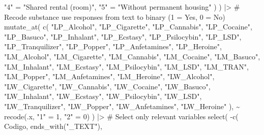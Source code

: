\documentclass[
  bookmarksnumbered]{article}
\newenvironment{Shaded}{\begin{snugshade}}{\end{snugshade}}
\newcommand{\CommentTok}[1]{\textcolor[rgb]{0.50,0.62,0.50}{#1}}
\newcommand{\DecValTok}[1]{\textcolor[rgb]{0.86,0.86,0.80}{#1}}
\newcommand{\FunctionTok}[1]{\textcolor[rgb]{0.94,0.94,0.56}{#1}}
\newcommand{\NormalTok}[1]{\textcolor[rgb]{0.80,0.80,0.80}{#1}}
\newcommand{\OtherTok}[1]{\textcolor[rgb]{0.94,0.94,0.56}{#1}}
\newcommand{\SpecialCharTok}[1]{\textcolor[rgb]{0.86,0.64,0.64}{#1}}
\newcommand{\StringTok}[1]{\textcolor[rgb]{0.80,0.58,0.58}{#1}}
\begin{document}
\begin{Shaded}
\begin{Highlighting}[]
      \StringTok{"4"} \OtherTok{=} \StringTok{"Shared rental (room)"}\NormalTok{,}
      \StringTok{"5"} \OtherTok{=} \StringTok{"Without permanent housing"}
\NormalTok{    )}
\NormalTok{  ) }\SpecialCharTok{|\textgreater{}}
  \CommentTok{\# Recode substance use responses from text to binary (1 = Yes, 0 = No)}
  \FunctionTok{mutate\_at}\NormalTok{(}
    \FunctionTok{c}\NormalTok{(}
      \StringTok{"LP\_Alcohol"}\NormalTok{,}
      \StringTok{"LP\_Cigarette"}\NormalTok{,}
      \StringTok{"LP\_Cannabis"}\NormalTok{,}
      \StringTok{"LP\_Cocaine"}\NormalTok{,}
      \StringTok{"LP\_Basuco"}\NormalTok{,}
      \StringTok{"LP\_Inhalant"}\NormalTok{,}
      \StringTok{"LP\_Ecstasy"}\NormalTok{,}
      \StringTok{"LP\_Psilocybin"}\NormalTok{,}
      \StringTok{"LP\_LSD"}\NormalTok{,}
      \StringTok{"LP\_Tranquilizer"}\NormalTok{,}
      \StringTok{"LP\_Popper"}\NormalTok{,}
      \StringTok{"LP\_Anfetamines"}\NormalTok{,}
      \StringTok{"LP\_Heroine"}\NormalTok{,}
      \StringTok{"LM\_Alcohol"}\NormalTok{,}
      \StringTok{"LM\_Cigarette"}\NormalTok{,}
      \StringTok{"LM\_Cannabis"}\NormalTok{,}
      \StringTok{"LM\_Cocaine"}\NormalTok{,}
      \StringTok{"LM\_Basuco"}\NormalTok{,}
      \StringTok{"LM\_Inhalant"}\NormalTok{,}
      \StringTok{"LM\_Ecstasy"}\NormalTok{,}
      \StringTok{"LM\_Psilocybin"}\NormalTok{,}
      \StringTok{"LM\_LSD"}\NormalTok{,}
      \StringTok{"LM\_TRAN"}\NormalTok{,}
      \StringTok{"LM\_Popper"}\NormalTok{,}
      \StringTok{"LM\_Anfetamines"}\NormalTok{,}
      \StringTok{"LM\_Heroine"}\NormalTok{,}
      \StringTok{"LW\_Alcohol"}\NormalTok{,}
      \StringTok{"LW\_Cigarette"}\NormalTok{,}
      \StringTok{"LW\_Cannabis"}\NormalTok{,}
      \StringTok{"LW\_Cocaine"}\NormalTok{,}
      \StringTok{"LW\_Basuco"}\NormalTok{,}
      \StringTok{"LW\_Inhalant"}\NormalTok{,}
      \StringTok{"LW\_Ecstasy"}\NormalTok{,}
      \StringTok{"LW\_Psilocybin"}\NormalTok{,}
      \StringTok{"LW\_LSD"}\NormalTok{,}
      \StringTok{"LW\_Tranquilizer"}\NormalTok{,}
      \StringTok{"LW\_Popper"}\NormalTok{,}
      \StringTok{"LW\_Anfetamines"}\NormalTok{,}
      \StringTok{"LW\_Heroine"}
\NormalTok{    ),}
    \SpecialCharTok{\textasciitilde{}} \FunctionTok{recode}\NormalTok{(.x, }\StringTok{"1"} \OtherTok{=} \DecValTok{1}\NormalTok{, }\StringTok{"2"} \OtherTok{=} \DecValTok{0}\NormalTok{)}
\NormalTok{  ) }\SpecialCharTok{|\textgreater{}}
  \CommentTok{\# Select only relevant variables}
  \FunctionTok{select}\NormalTok{(}
    \SpecialCharTok{{-}}\FunctionTok{c}\NormalTok{(}
\NormalTok{      Codigo,}
      \FunctionTok{ends\_with}\NormalTok{(}\StringTok{"\_TEXT"}\NormalTok{),}

\end{Highlighting}
\end{Shaded}
\end{document}
